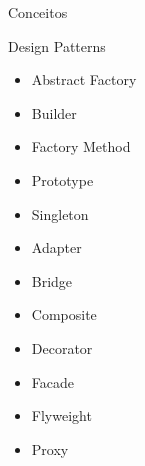 \begin{capitulo}{Conceitos}
\begin{secao}{Design Patterns}
  \begin{itemize}[label=\raisebox{0.25ex}{\normalsize$\bullet$}]
    \vspace{-0.3cm}
    \setlength{\itemindent}{2cm}
    \item \hspace{0.1cm} Abstract Factory
    \item \hspace{0.1cm} Builder
    \item \hspace{0.1cm} Factory Method
    \item \hspace{0.1cm} Prototype
    \item \hspace{0.1cm} Singleton
    \vspace{0.6cm}
  \end{itemize}

  \begin{itemize}[label=\raisebox{0.25ex}{\normalsize$\bullet$}]
    \vspace{-0.3cm}
    \setlength{\itemindent}{2cm}
    \item \hspace{0.1cm} Adapter
    \item \hspace{0.1cm} Bridge
    \item \hspace{0.1cm} Composite
    \item \hspace{0.1cm} Decorator
    \item \hspace{0.1cm} Facade
    \item \hspace{0.1cm} Flyweight
    \item \hspace{0.1cm} Proxy
    \vspace{0.6cm}
  \end{itemize}
  

\end{secao}
\end{capitulo}
